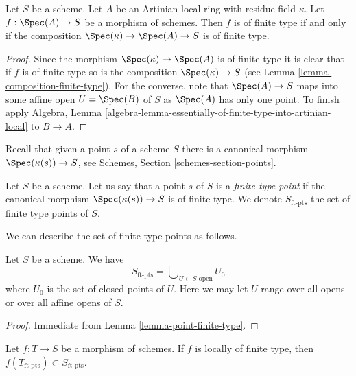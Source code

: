 \begin{lemma}
\label{lemma-artinian-finite-type}
Let $S$ be a scheme.
Let $A$ be an Artinian local ring with residue field $\kappa$.
Let $f : \Spec(A) \to S$ be a morphism of schemes.
Then $f$ is of finite type if and only if the composition
$\Spec(\kappa) \to \Spec(A) \to S$ is of finite type.
\end{lemma}

\begin{proof}
Since the morphism $\Spec(\kappa) \to \Spec(A)$ is of finite
type it is clear that if $f$ is of finite type so is the composition
$\Spec(\kappa) \to S$ (see Lemma \ref{lemma-composition-finite-type}).
For the converse, note that $\Spec(A) \to S$ maps into some affine open
$U = \Spec(B)$ of $S$ as $\Spec(A)$ has only one point. To finish
apply Algebra, Lemma
\ref{algebra-lemma-essentially-of-finite-type-into-artinian-local}
to $B \to A$.
\end{proof}

\noindent
Recall that given a point $s$ of a scheme $S$ there is a canonical
morphism $\Spec(\kappa(s)) \to S$, see
Schemes, Section \ref{schemes-section-points}.

\begin{definition}
\label{definition-finite-type-point}
Let $S$ be a scheme.
Let us say that a point $s$ of $S$ is a {\it finite type point}
if the canonical morphism $\Spec(\kappa(s)) \to S$ is of finite type.
We denote $S_{\text{ft-pts}}$ the set of finite type points of $S$.
\end{definition}

\noindent
We can describe the set of finite type points as follows.

\begin{lemma}
\label{lemma-identify-finite-type-points}
Let $S$ be a scheme. We have
$$
S_{\text{ft-pts}} = \bigcup\nolimits_{U \subset S\text{ open}} U_0
$$
where $U_0$ is the set of closed points of $U$.
Here we may let $U$ range over all opens or over all affine opens of $S$.
\end{lemma}

\begin{proof}
Immediate from Lemma \ref{lemma-point-finite-type}.
\end{proof}

\begin{lemma}
\label{lemma-finite-type-points-morphism}
Let $f : T \to S$ be a morphism of schemes.
If $f$ is locally of finite type, then
$f(T_{\text{ft-pts}}) \subset S_{\text{ft-pts}}$.
\end{lemma}

